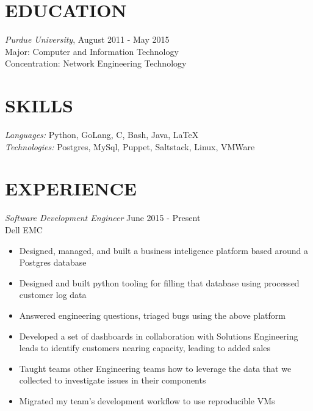 \documentclass[line,margin]{res}
\begin{document}
  \name{\textcolor{TealBlue}{Ethan Madden}}
  \address{ethan@madden.ninja - (812) 250-1419}
  \address{2049 NW 60th St, Seattle WA 98107}

\begin{resume}
  \section{\textcolor{TealBlue}{EDUCATION}} 
    {\sl Purdue University}, \hfill August 2011 - May 2015 \\
      Major: Computer and Information Technology \\
      Concentration: Network Engineering Technology

  \section{\textcolor{TealBlue}{SKILLS}} 
    {\sl Languages:}  Python, GoLang, C, Bash, Java, \LaTeX \\
    {\sl Technologies:} Postgres, MySql, Puppet, Saltstack, Linux, VMWare

  \section{\textcolor{TealBlue}{EXPERIENCE}} 
    {\sl Software Development Engineer} \hfill June 2015 - Present \\
      Dell EMC
      \begin{itemize}  \itemsep -2pt
        \item Designed, managed, and built a business inteligence platform based around a Postgres database
        \item Designed and built python tooling for filling that database using processed customer log data
        \item Answered engineering questions, triaged bugs using the above platform
        \item Developed a set of dashboards in collaboration with Solutions Engineering leads to identify customers nearing capacity, leading to added sales
        \item Taught teams other Engineering teams how to leverage the data that we collected to investigate issues in their components
        \item Migrated my team's development workflow to use reproducible VMs
      \end{itemize}


\end{resume}
\end{document}
